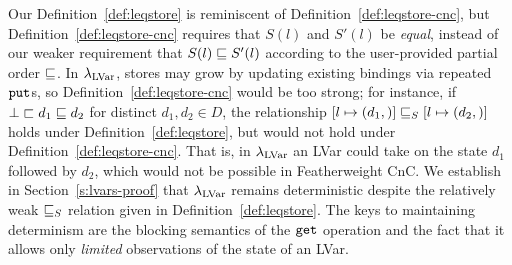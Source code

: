 \noindent Our Definition~\ref{def:leqstore} is reminiscent of
Definition~\ref{def:leqstore-cnc}, but
Definition~\ref{def:leqstore-cnc} requires that $S(l)$ and $S'(l)$
be \emph{equal}, instead of our weaker requirement that $S(l) \sqsubseteq
S'(l)$ according to the user-provided partial order $\sqsubseteq$.  In
$\lambda_{\textrm{LVar}}$, stores may grow by updating existing bindings via
repeated $\mbox{\texttt{put}}$s, so Definition~\ref{def:leqstore-cnc} would be too
strong; for instance, if $\bot \sqsubset d_1 \sqsubseteq d_2$ for distinct
$d_1, d_2 \in D$, the relationship
$\left[ l \mapsto (d_1, \right)] \sqsubseteq_S \left[ l \mapsto (d_2, \right)]$
holds under Definition~\ref{def:leqstore}, but would not hold under
Definition~\ref{def:leqstore-cnc}.  That is, in $\lambda_{\textrm{LVar}}$ an LVar
could take on the state $d_1$ followed by $d_2$, which would not be
possible in Featherweight CnC.  We establish in
Section~\ref{s:lvars-proof} that $\lambda_{\textrm{LVar}}$ remains deterministic
despite the relatively weak $ \sqsubseteq_S $ relation given in
Definition~\ref{def:leqstore}.  The keys to maintaining determinism
are the blocking semantics of the $\mbox{\texttt{get}}$ operation and the fact that
it allows only \emph{limited} observations of the state of an LVar.

